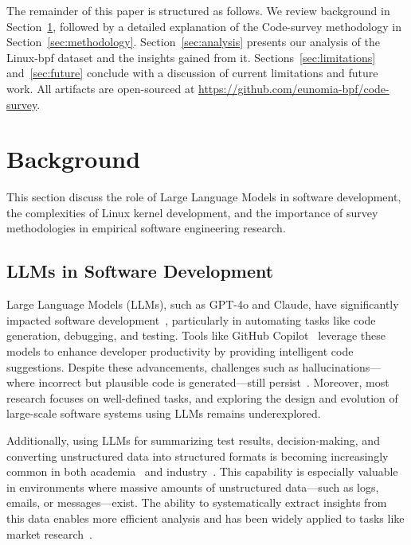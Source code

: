 \documentclass[sigconf,review,anonymous]{acmart}
\begin{document}
The remainder of this paper is structured as follows. We review background in Section~\ref{sec:related}, followed by a detailed explanation of the Code-survey methodology in Section~\ref{sec:methodology}. Section~\ref{sec:analysis} presents our analysis of the Linux-bpf dataset and the insights gained from it. Sections~\ref{sec:limitations} and~\ref{sec:future} conclude with a discussion of current limitations and future work. All artifacts are open-sourced at \url{https://github.com/eunomia-bpf/code-survey}.

\section{Background}
\label{sec:related}

This section discuss the role of Large Language Models in software development, the complexities of Linux kernel development, and the importance of survey methodologies in empirical software engineering research.

\subsection{LLMs in Software Development}

Large Language Models (LLMs), such as GPT-4o and Claude, have significantly impacted software development~\cite{jin2024llms}, particularly in automating tasks like code generation, debugging, and testing. Tools like GitHub Copilot~\cite{copilot} leverage these models to enhance developer productivity by providing intelligent code suggestions. Despite these advancements, challenges such as hallucinations—where incorrect but plausible code is generated—still persist~\cite{fan2023large,ji2023survey}. Moreover, most research focuses on well-defined tasks, and exploring the design and evolution of large-scale software systems using LLMs remains underexplored.

Additionally, using LLMs for summarizing test results, decision-making, and converting unstructured data into structured formats is becoming increasingly common in both academia~\cite{jin2024comprehensive,iourovitski2024grade,patel2024lotus} and industry~\cite{llmnvida}. This capability is especially valuable in environments where massive amounts of unstructured data—such as logs, emails, or messages—exist. The ability to systematically extract insights from this data enables more efficient analysis and has been widely applied to tasks like market research~\cite{brand2023using}.
\end{document}
